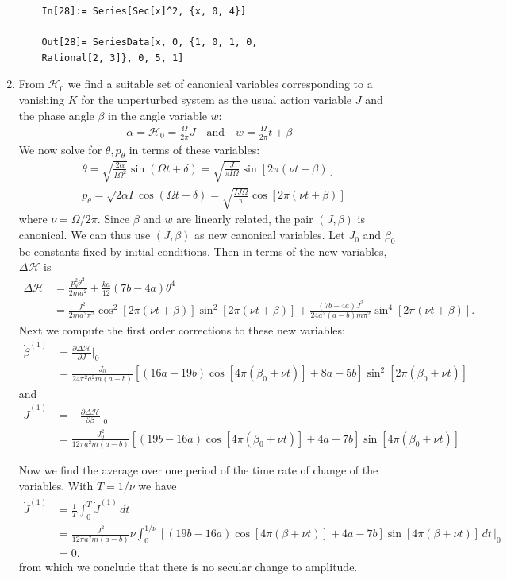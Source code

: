 \documentclass{article}
\theoremstyle{definition}
\newcommand{\p}{\partial}
\newcommand{\ham}{\mathcal{H}}
\newcommand{\al}{\alpha}
\newcommand{\be}{\beta}
\newcommand{\f}[2]{\frac{#1}{#2}}
\begin{document}
\begin{enumerate}[label=(\alph*)]
\begin{lstlisting}
	In[28]:= Series[Sec[x]^2, {x, 0, 4}]
	
	Out[28]= SeriesData[x, 0, {1, 0, 1, 0, 
	Rational[2, 3]}, 0, 5, 1]
	\end{lstlisting}
	
	
	\item From $\ham_0$ we find a suitable set of canonical variables corresponding to a vanishing $K$ for the unperturbed system as the usual action variable $J$ and the phase angle $\be$ in the angle variable $w$:
	\begin{align*}
	\al = \ham_0 = \f{\Omega}{2\pi} J \quad\text{and}\quad
	w = \f{\Omega}{2\pi} t + \be
	\end{align*}
	We now solve for $\theta, p_\theta$ in terms of these variables:
	\begin{align*}
	&\theta = \sqrt{\f{2\al}{I \Omega^2 }} \sin(\Omega t + \delta) = \sqrt{\f{J}{\pi I \Omega}} \sin[2\pi(\nu t + \be)]\\
	&p_\theta = \sqrt{2\al I }\cos(\Omega t + \delta) = \sqrt{\f{I J \Omega}{\pi}}\cos[2\pi(\nu t + \be)]
	\end{align*}
	where $\nu = \Omega/2\pi$. Since $\be$ and $w$ are linearly related, the pair $(J,\be)$ is canonical. We can thus use $(J,\be)$ as new canonical variables. Let $J_0$ and $\be_0$ be constants fixed by initial conditions. Then in terms of the new variables, $\Delta \ham$ is 
	\begin{align*}
	\Delta \ham 
	&= \f{p_\theta^2\theta^2}{2ma^2} + \f{ka}{12}(7b - 4a) \theta^4 \\
	&= \f{J^2}{2ma^2\pi^2} \cos^2[2\pi(\nu t + \be)] \sin^2[2\pi(\nu t + \be)] + \f{(7b-4a)J^2}{24a^2(a-b)m\pi^2}   \sin^4[2\pi(\nu t + \be)].
	\end{align*}
	Next we compute the first order corrections to these new variables:
	\begin{align*}
	\dot\be^{(1)} &= \f{\p \Delta \ham}{\p J}\bigg\vert_0 \\
	&=  \frac{J_0  }{24 \pi ^2 a^2 m (a-b)} [(16 a-19 b) \cos [4 \pi  (\beta_0 +\nu  t)] + 8 a-5
	b] \sin ^2[2 \pi  (\beta_0 +\nu  t)] 
	\end{align*}
	and 
	\begin{align*}
	\dot J^{(1)}&= -\f{\p \Delta \ham}{\p \be}\bigg\vert_0  \\
	&=\frac{J_0^2  }{12 \pi  a^2 m (a-b)} [(19 b-16 a) \cos [4 \pi  (\beta_0 +\nu  t)]+4 a-7
	b] \sin [4 \pi  (\beta_0 +\nu  t)]
	\end{align*}
	
	Now we find the average over one period of the time rate of change of the variables. With $T=1/\nu$ we have
	\begin{align*}
	\overline{\dot{J}^{(1)}} 
	&= \f{1}{T}\int^T_0 \dot J^{(1)}\,dt \\
	&= \frac{J^2  }{12 \pi  a^2 m (a-b)}  \nu \int^{1/\nu}_0 [(19 b-16 a) \cos [4 \pi  (\beta +\nu  t)]+4 a-7
	b] \sin [4 \pi  (\beta +\nu  t)]\,dt\,\bigg\vert_0 \\
	&= 0.
	\end{align*}
	from which we conclude that there is no secular change to amplitude. 
	

\end{enumerate}
\end{document}
